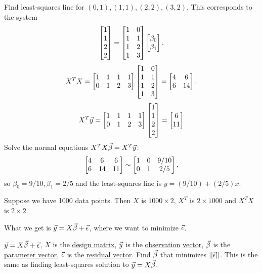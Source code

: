 \documentclass[10pt,a4paper]{article}
\begin{document}
\begin{example}
	Find least-squares  line for $(0,1),(1,1),(2,2),(3,2)$.
	This corresponds to the system
	$$\begin{bmatrix}1\\1\\2\\2\end{bmatrix}=\begin{bmatrix}1&0\\1&1\\1&2\\1&3\end{bmatrix}\begin{bmatrix}\beta_0\\\beta_1\end{bmatrix}.$$
	$$X^TX = \begin{bmatrix}1&1&1&1\\0&1&2&3\end{bmatrix}\begin{bmatrix}1&0\\1&1\\1&2\\1&3\end{bmatrix} = \begin{bmatrix}4&6\\6&14\end{bmatrix}.$$
	$$X^T\vec{y} = \begin{bmatrix}1&1&1&1\\0&1&2&3\end{bmatrix}\begin{bmatrix}1\\1\\2\\2\end{bmatrix} = \begin{bmatrix}6\\11\end{bmatrix}$$
	Solve the normal equations $X^TX\vec{\beta} = X^T\vec{y}$:
	$$\begin{bmatrix}4&6&6\\6&14&11\end{bmatrix}\sim\begin{bmatrix}1&0&9/10\\0&1&2/5\end{bmatrix},$$
	so $\beta_0 = 9/10,\beta_1=2/5$ and the least-squares line is $y = (9/10)+(2/5)x$.
\end{example}
\begin{example}
	Suppose we have 1000 data points. Then $X$ is $1000\times 2$, $X^T$ is $2\times 1000$ and $X^TX$ is $2\times 2$.
\end{example}
What we get is $\vec{y}=X\vec{\beta} + \vec{\epsilon}$, where we want to minimize $\vec{\epsilon}$.
\begin{definition}
	$\vec{y}=X\vec{\beta}+\vec{\epsilon}$, $X$ is the \underline{design matrix}, $\vec{y}$ is the \underline{observation} \ul{vector}, $\vec{\beta}$ is the \underline{parameter vector}, $\vec{\epsilon}$ is the \underline{residual vector}. Find $\vec{\beta}$ that minimizes $||\vec{\epsilon}||$. This is the same as finding least-squares solution to $\vec{y}=X\vec{\beta}$.
\end{definition}
\end{document}
